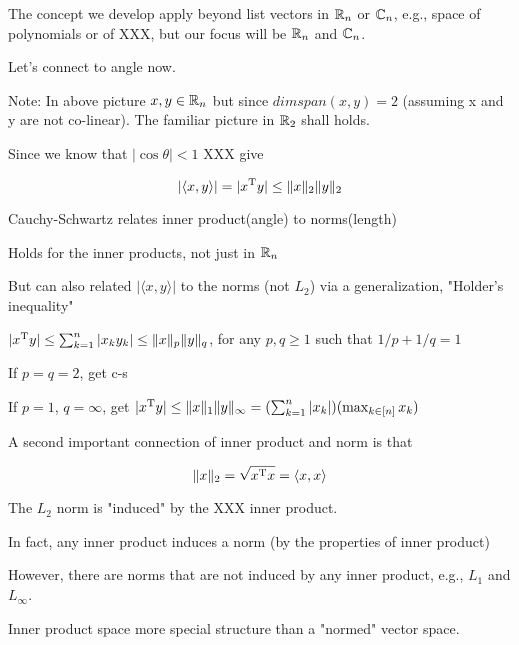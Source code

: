 The concept we develop apply beyond list vectors in $\mathbb{R}_{n}$ or $\mathbb{C}_{n}$, e.g., space of polynomials or of XXX, but our focus will be $\mathbb{R}_{n}$ and $\mathbb{C}_{n}$.

Let's connect to angle now.

\begin{marginfigure}
	\centering
	\resizebox{7.5cm}{3cm}{}
	\caption{}
	\label{}
\end{marginfigure}

Note: In above picture $x, y\in\mathbb{R}_{n}$ but since $dim{span({x, y})}=2$ (assuming x and y are not co-linear). The familiar picture in $\mathbb{R}_{2}$ shall holds.

Since we know that $\vert\cos\theta\vert <1$ XXX give

$$\vert\langle x,y\rangle\vert =\vert x^{{\rm T}}y\vert \leq \Vert x\Vert_{2} \Vert y\Vert_{2}$$

Cauchy-Schwartz relates inner product(angle) to norms(length)

Holds for the inner products, not just in $\mathbb{R}_{n}$

But can also related $\vert\langle x,y\rangle\vert$ to the norms (not $L_{2}$) via a generalization, "Holder's inequality"

$\vert x^{{\rm T}}y\vert\leq \sum_{k=1}^{n}\vert x_{k}y_{k}\vert \leq \Vert x\Vert_{p}\Vert y\Vert_{q}$, for any $p, q\geq 1$ such that $1/p+1/q=1$

If $p=q=2$, get c-s

If $p=1$, $q=\infty$, get $\vert x^{{\rm T}}y\vert\leq \Vert x\Vert_{1}\Vert y\Vert_{\infty}=(\sum_{k=1}^{n}\vert x_{k}\vert)(\max_{k\in [n]}x_{k})$



A second important connection of inner product and norm is that

$$\Vert x\Vert_{2}=\sqrt{x^{{\rm T}} x}=\langle x,x\rangle$$

The $L_{2}$ norm is "induced" by the XXX inner product.

In fact, any inner product induces a norm (by the properties of inner product)

However, there are norms that are not induced by any inner product, e.g., $L_{1}$ and $L_{\infty}$.

Inner product space more special structure than a "normed" vector space.

\begin{marginfigure}
	\centering
	\resizebox{7.5cm}{3cm}{}
	\caption{}
	\label{}
\end{marginfigure}

